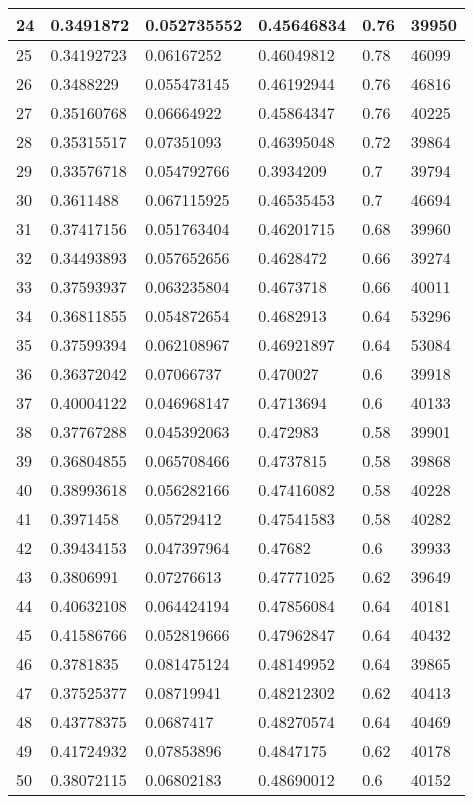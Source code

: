 \begin{longtable}{|l|l|l|l|l|l|}
24 & 0.3491872 & 0.052735552 & 0.45646834 & 0.76 & 39950 \\ \hline 
25 & 0.34192723 & 0.06167252 & 0.46049812 & 0.78 & 46099 \\ \hline 
26 & 0.3488229 & 0.055473145 & 0.46192944 & 0.76 & 46816 \\ \hline 
27 & 0.35160768 & 0.06664922 & 0.45864347 & 0.76 & 40225 \\ \hline 
28 & 0.35315517 & 0.07351093 & 0.46395048 & 0.72 & 39864 \\ \hline 
29 & 0.33576718 & 0.054792766 & 0.3934209 & 0.7 & 39794 \\ \hline 
30 & 0.3611488 & 0.067115925 & 0.46535453 & 0.7 & 46694 \\ \hline 
31 & 0.37417156 & 0.051763404 & 0.46201715 & 0.68 & 39960 \\ \hline 
32 & 0.34493893 & 0.057652656 & 0.4628472 & 0.66 & 39274 \\ \hline 
33 & 0.37593937 & 0.063235804 & 0.4673718 & 0.66 & 40011 \\ \hline 
34 & 0.36811855 & 0.054872654 & 0.4682913 & 0.64 & 53296 \\ \hline 
35 & 0.37599394 & 0.062108967 & 0.46921897 & 0.64 & 53084 \\ \hline 
36 & 0.36372042 & 0.07066737 & 0.470027 & 0.6 & 39918 \\ \hline 
37 & 0.40004122 & 0.046968147 & 0.4713694 & 0.6 & 40133 \\ \hline 
38 & 0.37767288 & 0.045392063 & 0.472983 & 0.58 & 39901 \\ \hline 
39 & 0.36804855 & 0.065708466 & 0.4737815 & 0.58 & 39868 \\ \hline 
40 & 0.38993618 & 0.056282166 & 0.47416082 & 0.58 & 40228 \\ \hline 
41 & 0.3971458 & 0.05729412 & 0.47541583 & 0.58 & 40282 \\ \hline 
42 & 0.39434153 & 0.047397964 & 0.47682 & 0.6 & 39933 \\ \hline 
43 & 0.3806991 & 0.07276613 & 0.47771025 & 0.62 & 39649 \\ \hline 
44 & 0.40632108 & 0.064424194 & 0.47856084 & 0.64 & 40181 \\ \hline 
45 & 0.41586766 & 0.052819666 & 0.47962847 & 0.64 & 40432 \\ \hline 
46 & 0.3781835 & 0.081475124 & 0.48149952 & 0.64 & 39865 \\ \hline 
47 & 0.37525377 & 0.08719941 & 0.48212302 & 0.62 & 40413 \\ \hline 
48 & 0.43778375 & 0.0687417 & 0.48270574 & 0.64 & 40469 \\ \hline 
49 & 0.41724932 & 0.07853896 & 0.4847175 & 0.62 & 40178 \\ \hline 
50 & 0.38072115 & 0.06802183 & 0.48690012 & 0.6 & 40152 \\ \hline 
\end{longtable}